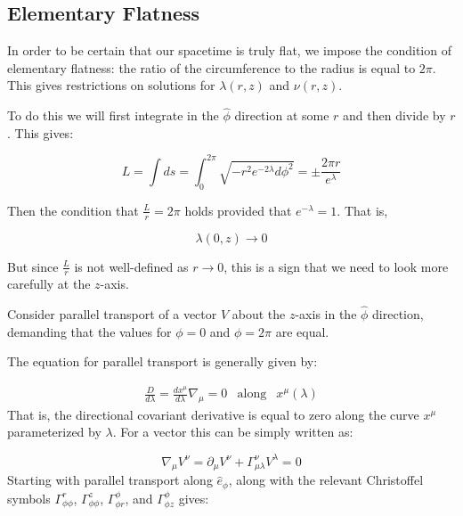 \documentclass{article}
\begin{document}
\subsection{Elementary Flatness}

In order to be certain that our spacetime is truly flat, we impose the condition of elementary flatness: the ratio of the circumference to the radius is equal to $2\pi$. This gives restrictions on solutions for $\lambda\left(r,z\right)$ and $\nu\left(r,z\right)$.

To do this we will first integrate in the $\hat{\phi}$ direction at
some $r$ and then divide by $r$. This gives:

\begin{equation}
  \label{eq:phi-hat-length}
  L=\int ds =
  \int_0^{2\pi}\sqrt{-r^2e^{-2\lambda}d\phi^2}=\pm\frac{2\pi r}{e^{\lambda}}
\end{equation}

Then the condition that $\frac{L}{r}=2\pi$ holds provided that
$e^{-\lambda}=1$. That is,

\begin{equation}
	\label{eq:lambda-elem-flat}
	\lambda(0,z)\rightarrow 0
\end{equation} 

But since $\frac{L}{r}$ is not well-defined as $r\rightarrow 0$, this is a sign
that we need to look more carefully at the $z$-axis.

Consider parallel transport of a vector $V$ about the $z$-axis in
the $\hat{\phi}$ direction, demanding that the values
for $\phi=0$ and $\phi=2\pi$ are equal. 

The equation for parallel transport is generally given by:
  	
\begin{equation}
\begin{array}{rcl} \frac{D}{d\lambda}=\frac{dx^{\mu}}{d\lambda}\nabla_{\mu}=0 & \mbox{along} & x^{\mu}\left(\lambda\right)	  	
\end{array}
\end{equation}	  	
That is, the directional covariant derivative is equal to zero along
the curve $x^{\mu}$ parameterized by $\lambda$. For a vector this can
be simply written as:

\begin{equation}
\label{eq:x-par-xport}
\nabla_\mu V^{\nu}=\partial_\mu V^\nu+\Gamma^\nu_{\mu\lambda} V^\lambda=0
\end{equation}	  	
Starting with parallel transport along $\hat{e}_{\phi}$,  along with the relevant Christoffel symbols $\Gamma^{r}_{\phi\phi}$, $\Gamma^{z}_{\phi\phi}$, $\Gamma^{\phi}_{\phi r}$, and $\Gamma^{\phi}_{\phi z}$ gives:
	  	
\end{document}
